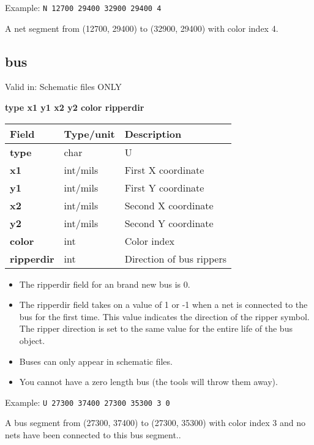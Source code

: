 \documentclass{article}
\begin{document}
Example:\newline
{\tt N 12700 29400 32900 29400 4}

A net segment from (12700, 29400) to (32900, 29400) with color index 4.

\subsection{bus}

Valid in: Schematic files ONLY

{\bf type x1 y1 x2 y2 color ripperdir}

\begin{table}[h]
\begin{tabular}{|l|l|l|} \hline
Field 		& Type/unit 	& Description \\ \hline 
\hline
{\bf type} 	& char		& U \\ \hline
{\bf x1} 	& int/mils 	& First X coordinate \\ \hline
{\bf y1} 	& int/mils	& First Y coordinate \\ \hline
{\bf x2} 	& int/mils	& Second X coordinate \\ \hline
{\bf y2} 	& int/mils	& Second Y coordinate \\ \hline
{\bf color} 	& int		& Color index \\ \hline
{\bf ripperdir} & int 		& Direction of bus rippers \\ \hline
\end{tabular}
\end{table}

\begin{itemize}
\item The ripperdir field for an brand new bus is 0.
\item The ripperdir field takes on a value of 1 or -1 when a net is connected
      to the bus for the first time.  This value indicates the direction of
      the ripper symbol.  The ripper direction is set to the same value for the
      entire life of the bus object. 
\item Buses can only appear in schematic files.
\item You cannot have a zero length bus (the tools will throw them away).
\end{itemize}

Example:\newline
{\tt U 27300 37400 27300 35300 3 0}

A bus segment from (27300, 37400) to (27300, 35300) with color index 3 and
no nets have been connected to this bus segment..
\end{document}
